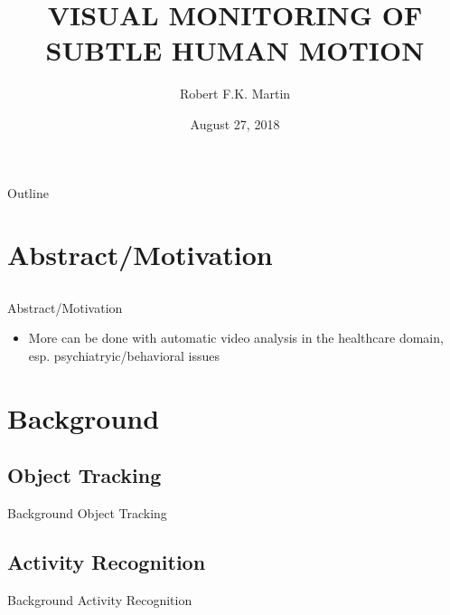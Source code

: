 \documentclass{beamer}
\title[]{VISUAL MONITORING OF SUBTLE HUMAN MOTION}
\author{Robert F.K. Martin}
\institute{Department of Computer Science \\ University of Minnesota}
\date{August 27, 2018}
\begin{document}
%
%
\begin{frame}
  \titlepage
\end{frame}

%
%
\begin{frame}{Outline}
\end{frame}
\section{Abstract/Motivation}
\subsection{}
%
\begin{frame}{Abstract/Motivation}
\begin{itemize}
	\item More can be done with automatic video analysis in the healthcare domain, esp. psychiatryic/behavioral issues
\end{itemize}
\end{frame}
\section{Background}
\subsection{Object Tracking}
%
\begin{frame}{Background}
Object Tracking
\end{frame}
\subsection{Activity Recognition}
%
\begin{frame}{Background}
Activity Recognition
\end{frame}
%
\end{document}
